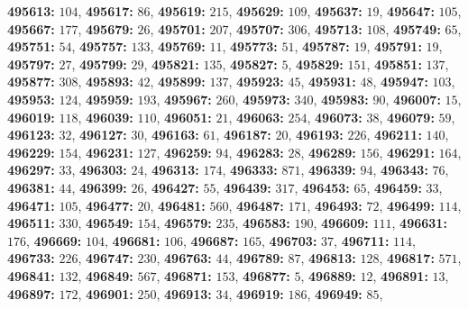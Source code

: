 \textsf{\bfseries 495613:} $104$, \textsf{\bfseries 495617:} $86$, \textsf{\bfseries 495619:} $215$, \textsf{\bfseries 495629:} $109$, \textsf{\bfseries 495637:} $19$, \textsf{\bfseries 495647:} $105$, \textsf{\bfseries 495667:} $177$, \textsf{\bfseries 495679:} $26$, \textsf{\bfseries 495701:} $207$, \textsf{\bfseries 495707:} $306$, \textsf{\bfseries 495713:} $108$, \textsf{\bfseries 495749:} $65$, \textsf{\bfseries 495751:} $54$, \textsf{\bfseries 495757:} $133$, \textsf{\bfseries 495769:} $11$, \textsf{\bfseries 495773:} $51$, \textsf{\bfseries 495787:} $19$, \textsf{\bfseries 495791:} $19$, \textsf{\bfseries 495797:} $27$, \textsf{\bfseries 495799:} $29$, \textsf{\bfseries 495821:} $135$, \textsf{\bfseries 495827:} $5$, \textsf{\bfseries 495829:} $151$, \textsf{\bfseries 495851:} $137$, \textsf{\bfseries 495877:} $308$, \textsf{\bfseries 495893:} $42$, \textsf{\bfseries 495899:} $137$, \textsf{\bfseries 495923:} $45$, \textsf{\bfseries 495931:} $48$, \textsf{\bfseries 495947:} $103$, \textsf{\bfseries 495953:} $124$, \textsf{\bfseries 495959:} $193$, \textsf{\bfseries 495967:} $260$, \textsf{\bfseries 495973:} $340$, \textsf{\bfseries 495983:} $90$, \textsf{\bfseries 496007:} $15$, \textsf{\bfseries 496019:} $118$, \textsf{\bfseries 496039:} $110$, \textsf{\bfseries 496051:} $21$, \textsf{\bfseries 496063:} $254$, \textsf{\bfseries 496073:} $38$, \textsf{\bfseries 496079:} $59$, \textsf{\bfseries 496123:} $32$, \textsf{\bfseries 496127:} $30$, \textsf{\bfseries 496163:} $61$, \textsf{\bfseries 496187:} $20$, \textsf{\bfseries 496193:} $226$, \textsf{\bfseries 496211:} $140$, \textsf{\bfseries 496229:} $154$, \textsf{\bfseries 496231:} $127$, \textsf{\bfseries 496259:} $94$, \textsf{\bfseries 496283:} $28$, \textsf{\bfseries 496289:} $156$, \textsf{\bfseries 496291:} $164$, \textsf{\bfseries 496297:} $33$, \textsf{\bfseries 496303:} $24$, \textsf{\bfseries 496313:} $174$, \textsf{\bfseries 496333:} $871$, \textsf{\bfseries 496339:} $94$, \textsf{\bfseries 496343:} $76$, \textsf{\bfseries 496381:} $44$, \textsf{\bfseries 496399:} $26$, \textsf{\bfseries 496427:} $55$, \textsf{\bfseries 496439:} $317$, \textsf{\bfseries 496453:} $65$, \textsf{\bfseries 496459:} $33$, \textsf{\bfseries 496471:} $105$, \textsf{\bfseries 496477:} $20$, \textsf{\bfseries 496481:} $560$, \textsf{\bfseries 496487:} $171$, \textsf{\bfseries 496493:} $72$, \textsf{\bfseries 496499:} $114$, \textsf{\bfseries 496511:} $330$, \textsf{\bfseries 496549:} $154$, \textsf{\bfseries 496579:} $235$, \textsf{\bfseries 496583:} $190$, \textsf{\bfseries 496609:} $111$, \textsf{\bfseries 496631:} $176$, \textsf{\bfseries 496669:} $104$, \textsf{\bfseries 496681:} $106$, \textsf{\bfseries 496687:} $165$, \textsf{\bfseries 496703:} $37$, \textsf{\bfseries 496711:} $114$, \textsf{\bfseries 496733:} $226$, \textsf{\bfseries 496747:} $230$, \textsf{\bfseries 496763:} $44$, \textsf{\bfseries 496789:} $87$, \textsf{\bfseries 496813:} $128$, \textsf{\bfseries 496817:} $571$, \textsf{\bfseries 496841:} $132$, \textsf{\bfseries 496849:} $567$, \textsf{\bfseries 496871:} $153$, \textsf{\bfseries 496877:} $5$, \textsf{\bfseries 496889:} $12$, \textsf{\bfseries 496891:} $13$, \textsf{\bfseries 496897:} $172$, \textsf{\bfseries 496901:} $250$, \textsf{\bfseries 496913:} $34$, \textsf{\bfseries 496919:} $186$, \textsf{\bfseries 496949:} $85$, 
